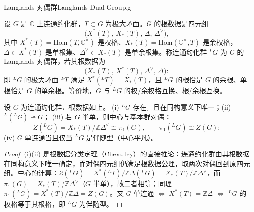 \begin{centry}{Langlands 对偶群}{Langlands Dual Group}{lg}

\begin{definition}[对偶根数据]
设 $G$ 是 $\mathbb C$ 上连通约化群，$T\subset G$ 为极大环面。$G$ 的根数据是四元组
\[
\bigl(X^{*}(T),\,X_{*}(T),\,\Delta,\,\Delta^{\vee}\bigr),
\]
其中 $X^{*}(T)=\mathrm{Hom}(T,\mathbb C^{\times})$ 是权格、$X_{*}(T)=\mathrm{Hom}(\mathbb C^{\times},T)$ 是余权格，$\Delta\subset X^{*}(T)$ 是单根集、$\Delta^{\vee}\subset X_{*}(T)$ 是单余根集。称连通约化群 ${}^{L}G$ 为 $G$ 的 Langlands 对偶群，若其根数据为
\[
\bigl(X_{*}(T),\,X^{*}(T),\,\Delta^{\vee},\,\Delta\bigr):
\]
即 ${}^{L}G$ 的极大环面 ${}^{L}T$ 满足 $X^{*}({}^{L}T)=X_{*}(T)$，且 ${}^{L}G$ 的根恰是 $G$ 的余根、单根恰是 $G$ 的单余根。等价地，$G$ 与 ${}^{L}G$ 的权/余权格互换、根/余根互换。
\end{definition}

\begin{theorem}[对偶群的基本性质]
设 $G$ 为连通约化群，根数据如上。
(i) ${}^{L}G$ 存在，且在同构意义下唯一；(ii) ${}^{L}({}^{L}G)\cong G$；
(iii) 若 $G$ 半单，则中心与基本群对偶：
\[
Z({}^{L}G)=X_{*}(T)/\mathbb Z\Delta^{\vee}\cong\pi_{1}(G),\qquad
\pi_{1}({}^{L}G)\cong Z(G);
\]
(iv) $G$ 单连通当且仅当 ${}^{L}G$ 是伴随型（中心平凡）。
\end{theorem}
\begin{proof}
(i)(ii) 是根数据分类定理（Chevalley）的直接推论：连通约化群由其根数据在同构意义下唯一确定，而对偶四元组仍满足根数据公理，取两次对偶回到原四元组。中心的计算：$Z({}^{L}G)=X^{*}({}^{L}T)/\mathbb Z\Delta({}^{L}G)=X_{*}(T)/\mathbb Z\Delta^{\vee}$，而 $\pi_{1}(G)=X_{*}(T)/\mathbb Z\Delta^{\vee}$（$G$ 半单），故二者相等；同理 $\pi_{1}({}^{L}G)=X^{*}(T)/\mathbb Z\Delta=Z(G)$。又 $G$ 单连通 $\iff$ $X^{*}(T)=\mathbb Z\Delta$ $\iff$ ${}^{L}G$ 的权格等于其根格，即 ${}^{L}G$ 为伴随型。
\end{proof}



\end{centry}
